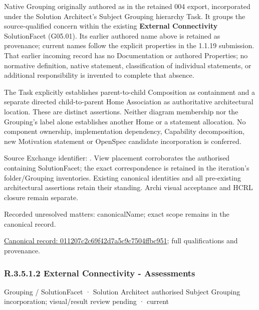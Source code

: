 Native Grouping originally authored as \texttt{} in the retained 004 export,
incorporated under the Solution Architect's Subject Grouping hierarchy Task.
It groups the source-qualified \texttt{} concern within
the existing \textbf{External Connectivity} SolutionFacet (G05.01). Its earlier authored name above is retained as provenance; current names
follow the explicit properties in the 1.1.19 submission.
That earlier incoming record has no Documentation or authored Properties; no normative
definition, native statement, classification of individual statements, or
additional responsibility is invented to complete that absence.



The Task explicitly establishes parent-to-child Composition as containment and
a separate directed child-to-parent Home Association as authoritative architectural
location. These are distinct assertions. Neither diagram membership nor the
Grouping's label alone establishes another Home or a statement allocation.
No component ownership, implementation dependency, Capability decomposition,
new Motivation statement or OpenSpec candidate incorporation is conferred.



Source Exchange identifier: \texttt{}. View placement corroborates
the authorised containing SolutionFacet; the exact correspondence is retained in the
iteration's folder/Grouping inventories. Existing canonical identities and all
pre-existing architectural assertions retain their standing. Archi visual
acceptance and HCRL closure remain separate.


{\small Recorded unresolved matters: canonicalName; exact scope remains in the canonical record.}\par
{\footnotesize \href{../../../../../../../continuum/grouping/011207c2c69f42d7a5c9c7504ffbc951.md}{Canonical record: 011207c2c69f42d7a5c9c7504ffbc951}; full qualifications and provenance.}\par
\subsubsection*{R.3.5.1.2 External Connectivity - Assessments}
\label{navigation:R.3.5.1.2}

\label{element:4cc994e1de714cc8915dc965d2694808}
{\small Grouping / SolutionFacet · Solution Architect authorised Subject Grouping incorporation; visual/result review pending · current}\par

